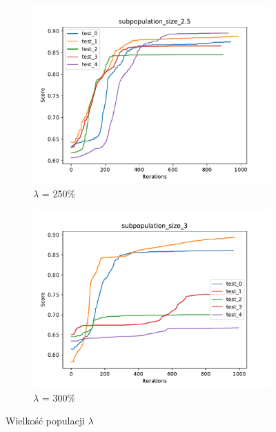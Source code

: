 \begin{figure}[H]
\begin{subfigure}[b]{0.49\linewidth}
        \includegraphics[width=\linewidth]{img/subpopulation_size_2.5.pdf}
        \caption{$\lambda$ = 250\%}
    \end{subfigure}
    \begin{subfigure}[b]{0.49\linewidth}
        \includegraphics[width=\linewidth]{img/subpopulation_size_3.pdf}
        \caption{$\lambda$ = 300\%}
    \end{subfigure}
    \caption{Wielkość populacji $\lambda$}
    \label{fig:picking}
\end{figure}

